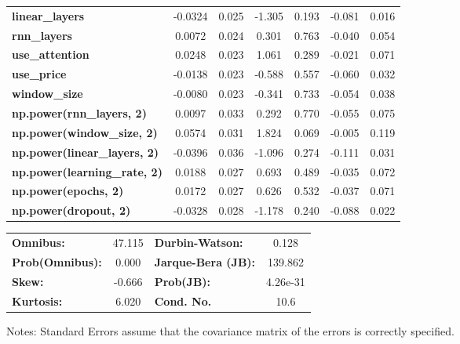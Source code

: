 \begin{center}
\begin{tabular}{lcccccc}
\textbf{linear\_layers}              &      -0.0324  &        0.025     &    -1.305  &         0.193        &       -0.081    &        0.016     \\
\textbf{rnn\_layers}                 &       0.0072  &        0.024     &     0.301  &         0.763        &       -0.040    &        0.054     \\
\textbf{use\_attention}              &       0.0248  &        0.023     &     1.061  &         0.289        &       -0.021    &        0.071     \\
\textbf{use\_price}                  &      -0.0138  &        0.023     &    -0.588  &         0.557        &       -0.060    &        0.032     \\
\textbf{window\_size}                &      -0.0080  &        0.023     &    -0.341  &         0.733        &       -0.054    &        0.038     \\
\textbf{np.power(rnn\_layers, 2)}    &       0.0097  &        0.033     &     0.292  &         0.770        &       -0.055    &        0.075     \\
\textbf{np.power(window\_size, 2)}   &       0.0574  &        0.031     &     1.824  &         0.069        &       -0.005    &        0.119     \\
\textbf{np.power(linear\_layers, 2)} &      -0.0396  &        0.036     &    -1.096  &         0.274        &       -0.111    &        0.031     \\
\textbf{np.power(learning\_rate, 2)} &       0.0188  &        0.027     &     0.693  &         0.489        &       -0.035    &        0.072     \\
\textbf{np.power(epochs, 2)}         &       0.0172  &        0.027     &     0.626  &         0.532        &       -0.037    &        0.071     \\
\textbf{np.power(dropout, 2)}        &      -0.0328  &        0.028     &    -1.178  &         0.240        &       -0.088    &        0.022     \\
\bottomrule
\end{tabular}
\begin{tabular}{lclc}
\textbf{Omnibus:}       & 47.115 & \textbf{  Durbin-Watson:     } &    0.128  \\
\textbf{Prob(Omnibus):} &  0.000 & \textbf{  Jarque-Bera (JB):  } &  139.862  \\
\textbf{Skew:}          & -0.666 & \textbf{  Prob(JB):          } & 4.26e-31  \\
\textbf{Kurtosis:}      &  6.020 & \textbf{  Cond. No.          } &     10.6  \\
\bottomrule
\end{tabular}
\end{center}

Notes: \newline
 [1] Standard Errors assume that the covariance matrix of the errors is correctly specified.